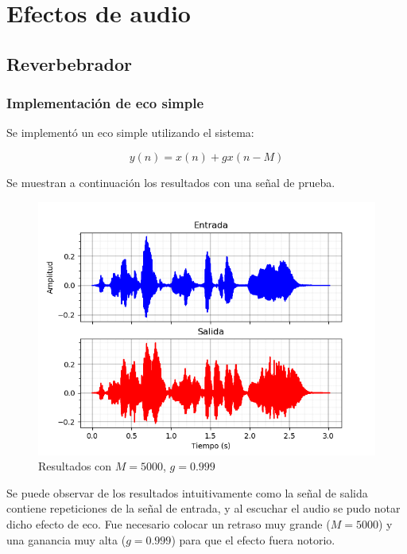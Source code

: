 \documentclass[assd_tp2_main.tex]{subfiles}
\begin{document}
\section{Efectos de audio}

\subsection{Reverbebrador}

\subsubsection{Implementación de eco simple}

Se implementó un eco simple utilizando el sistema:

\begin{equation}
	y(n)=x(n)+gx(n-M)
\end{equation}

Se muestran a continuación los resultados con una señal de prueba.

\begin{figure}[H]	
	\centering
	\includegraphics[scale=1]{graficos/EJ8/eco_simple.png}
	\caption{Resultados con $M=5000$, $g=0.999$ }
	\label{fig:bloqueElemental}
\end{figure}

Se puede observar de los resultados intuitivamente como la señal de salida contiene repeticiones de la señal de entrada, y al escuchar el audio se pudo notar dicho efecto de eco. Fue necesario colocar un retraso muy grande ($M=5000$) y una ganancia muy alta ($g=0.999$) para que el efecto fuera notorio.
\end{document}
